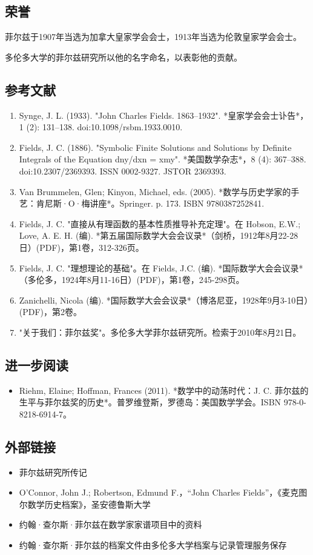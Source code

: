 \subsection{荣誉}  
菲尔兹于1907年当选为加拿大皇家学会会士，1913年当选为伦敦皇家学会会士。

多伦多大学的菲尔兹研究所以他的名字命名，以表彰他的贡献。
\subsection{参考文献}  
\begin{enumerate}
\item Synge, J. L. (1933). "John Charles Fields. 1863–1932". *皇家学会会士讣告*，1 (2): 131–138. doi:10.1098/rsbm.1933.0010.  
\item Fields, J. C. (1886). "Symbolic Finite Solutions and Solutions by Definite Integrals of the Equation dny/dxn = xmy". *美国数学杂志*，8 (4): 367–388. doi:10.2307/2369393. ISSN 0002-9327. JSTOR 2369393.  
\item Van Brummelen, Glen; Kinyon, Michael, eds. (2005). *数学与历史学家的手艺：肯尼斯·O·梅讲座*。Springer. p. 173. ISBN 9780387252841.  
\item Fields, J. C. "直接从有理函数的基本性质推导补充定理"。在 Hobson, E.W.; Love, A. E. H. (编). *第五届国际数学大会会议录*（剑桥，1912年8月22-28日）(PDF)，第1卷，312-326页。  
\item Fields, J. C. "理想理论的基础"。在 Fields, J.C. (编). *国际数学大会会议录*（多伦多，1924年8月11-16日）(PDF)，第1卷，245-298页。  
\item Zanichelli, Nicola (编). *国际数学大会会议录*（博洛尼亚，1928年9月3-10日）(PDF)，第2卷。  
\item "关于我们：菲尔兹奖"。多伦多大学菲尔兹研究所。检索于2010年8月21日。
\end{enumerate}
\subsection{进一步阅读}  
\begin{itemize}
\item Riehm, Elaine; Hoffman, Frances (2011). *数学中的动荡时代：J. C. 菲尔兹的生平与菲尔兹奖的历史*。普罗维登斯，罗德岛：美国数学学会。ISBN 978-0-8218-6914-7。
\end{itemize}
\subsection{外部链接}
\begin{itemize}
\item 菲尔兹研究所传记  
\item O'Connor, John J.; Robertson, Edmund F.，“John Charles Fields”，《麦克图尔数学历史档案》，圣安德鲁斯大学  
\item 约翰·查尔斯·菲尔兹在数学家家谱项目中的资料  
\item 约翰·查尔斯·菲尔兹的档案文件由多伦多大学档案与记录管理服务保存
\end{itemize}
